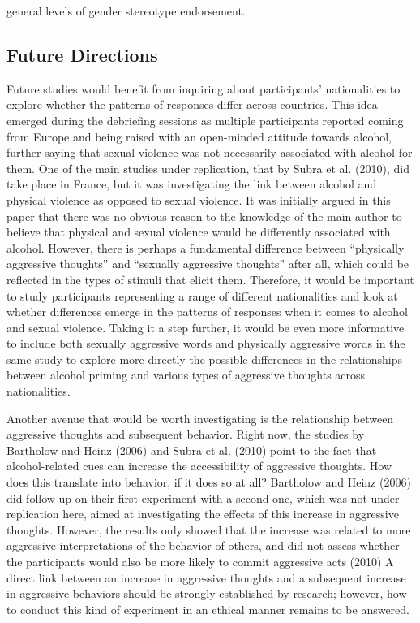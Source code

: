 \documentclass[authordate, serif, review]{jote-article}
\begin{document}
\begin{multicols}{2}
general levels of gender stereotype endorsement. 

{}
\subsection*{Future Directions }

Future studies would benefit from inquiring about participants' nationalities to explore whether the patterns of responses differ across countries. This idea emerged during the debriefing sessions as multiple participants reported coming from Europe and being raised with an open-minded attitude towards alcohol, further saying that sexual violence was not necessarily associated with alcohol for them. One of the main studies under replication, that by Subra et al. (2010), did take place in France, but it was investigating the link between alcohol and physical violence as opposed to sexual violence. It was initially argued in this paper that there was no obvious reason to the knowledge of the main author to believe that physical and sexual violence would be differently associated with alcohol. However, there is perhaps a fundamental difference between ``physically aggressive thoughts'' and ``sexually aggressive thoughts'' after all, which could be reflected in the types of stimuli that elicit them. Therefore, it would be important to study participants representing a range of different nationalities and look at whether differences emerge in the patterns of responses when it comes to alcohol and sexual violence. Taking it a step further, it would be even more informative to include both sexually aggressive words and physically aggressive words in the same study to explore more directly the possible differences in the relationships between alcohol priming and various types of aggressive thoughts across nationalities.

Another avenue that would be worth investigating is the relationship between aggressive thoughts and subsequent behavior. Right now, the studies by Bartholow and Heinz (2006) and Subra et al. (2010) point to the fact that alcohol-related cues can increase the accessibility of aggressive thoughts. How does this translate into behavior, if it does so at all? Bartholow and Heinz (2006) did follow up on their first experiment with a second one, which was not under replication here, aimed at investigating the effects of this increase in aggressive thoughts. However, the results only showed that the increase was related to more aggressive interpretations of the behavior of others, and did not assess whether the participants would also be more likely to commit aggressive acts (2010) A direct link between an increase in aggressive thoughts and a subsequent increase in aggressive behaviors should be strongly established by research; however, how to conduct this kind of experiment in an ethical manner remains to be answered. 


\end{multicols}
\end{document}
